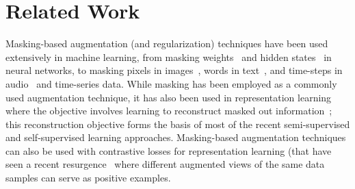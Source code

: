 \documentclass{article}
\begin{document}
\section{Related Work}

Masking-based augmentation (and regularization) techniques have been used extensively in machine learning, from masking weights~\citep{germain2015made} and hidden states~\citep{dropout,autodropout,ghiasi2018dropblock,pmlr-v28-wan13} in neural networks, to masking pixels in images~\citep{devries2017improved,Zhong_Zheng_Kang_Li_Yang_2020,8100170,10.1145/344779.344972}, words in text~\citep{devlin2018bert,donahue-etal-2020-enabling,gal2016theoretically}, and time-steps in audio~\citep{specaugment,clar} and time-series data. While masking has been employed as a commonly used augmentation technique, it has also been used in representation learning where the objective involves learning to reconstruct masked out information~\citep{donahue-etal-2020-enabling,10.1145/344779.344972,devlin2018bert}; this reconstruction objective forms the basis of most of the recent semi-supervised and self-supervised learning approaches. Masking-based augmentation techniques can also be used with contrastive losses for representation learning (that have seen a recent resurgence~\citep{zbontar2021barlow,chen2020simple,he2020momentum} where different augmented views of the same data samples can serve as positive examples.
\end{document}
